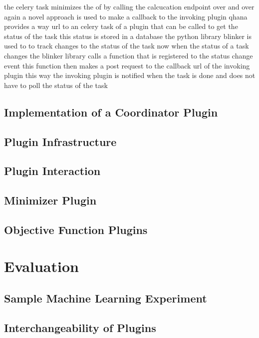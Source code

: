 \documentclass[
  a4paper,  %
  twoside,  %
  bibliography=totoc,
  headsepline,
  cleardoublepage=empty,
  parskip=half,
  draft=false
]{scrbook}
\begin{document}
the celery task minimizes the of by calling the calcucation endpoint over and over again
a novel approach is used to make a callback to the invoking plugin
qhana provides a way url to an celery task of a plugin that can be called to get the status of the task
this status is stored in a database
the python library blinker is used to to track changes to the status of the task
now when the status of a task changes the blinker library calls a function that is registered to the status change event
this function then makes a post request to the callback url of the invoking plugin
this way the invoking plugin is notified when the task is done and does not have to poll the status of the task

\section{Implementation of a Coordinator Plugin}

\section{Plugin Infrastructure}
\label{sec:pluginInfrastructure}
\section{Plugin Interaction}
\label{sec:pluginInteraction}
\section{Minimizer Plugin}
\label{sec:minimizerPlugin}
\section{Objective Function Plugins}
\label{sec:objectiveFunctionPlugins}


\chapter{Evaluation}
\label{chap:evaluation}
\section{Sample Machine Learning Experiment}
\label{sec:sampleMachineLearningExperiment}
\section{Interchangeability of Plugins}
\label{sec:interchangeabilityOfPlugins}
\end{document}
